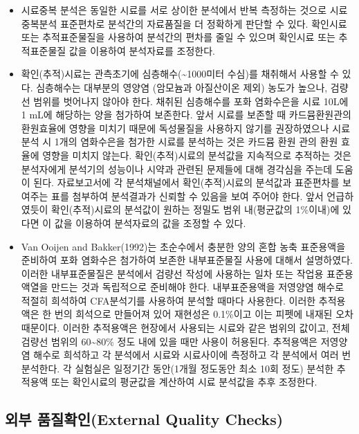 \documentclass[
]{book}
\begin{document}
\begin{itemize}
\item
  시료중복 분석은 동일한 시료를 서로 상이한 분석에서 반복 측정하는 것으로 시료 중복분석 표준편차로 분석간의 자료품질을 더 정확하게 판단할 수 있다. 확인시료 또는 추적표준물질을 사용하여 분석간의 편차를 줄일 수 있으며 확인시료 또는 추적표준물질 값을 이용하여 분석자료를 조정한다.
\item
  확인(추적)시료는 관측초기에 심층해수(\textasciitilde1000미터 수심)를 채취해서 사용할 수 있다. 심층해수는 대부분의 영양염 (암모늄과 아질산이온 제외) 농도가 높으나, 검량선 범위를 벗어나지 않아야 한다. 채취된 심층해수를 포화 염화수은을 시료 10L에 1 mL에 해당하는 양을 첨가하여 보존한다. 앞서 시료를 보존할 때 카드뮴환원관의 환원효율에 영향을 미치기 때문에 독성물질을 사용하지 않기를 권장하였으나 시료분석 시 1개의 염화수은을 첨가한 시료를 분석하는 것은 카드뮴 환원 관의 환원 효율에 영향을 미치지 않는다. 확인(추적)시료의 분석값을 지속적으로 추적하는 것은 분석자에게 분석기의 성능이나 시약과 관련된 문제들에 대해 경각심을 주는데 도움이 된다. 자료보고서에 각 분석채널에서 확인(추적)시료의 분석값과 표준편차를 보여주는 표를 첨부하여 분석결과가 신뢰할 수 있음을 보여 주어야 한다. 앞서 언급하였듯이 확인(추적)시료의 분석값이 원하는 정밀도 범위 내(평균값의 1\%이내)에 있다면 이 값을 이용하여 분석자료의 값을 조정할 수 있다.
\item
  Van Ooijen and Bakker(1992)는 초순수에서 충분한 양의 혼합 농축 표준용액을 준비하여 포화 염화수은 첨가하여 보존한 내부표준물질 사용에 대해서 설명하였다. 이러한 내부표준물질은 분석에서 검량선 작성에 사용하는 일차 또는 작업용 표준용액열을 만드는 것과 독립적으로 준비해야 한다. 내부표준용액을 저영양염 해수로 적절히 희석하여 CFA분석기를 사용하여 분석할 때마다 사용한다. 이러한 추적용액은 한 번의 희석으로 만들어져 있어 재현성은 0.1\%이고 이는 피펫에 내재된 오차 때문이다. 이러한 추적용액은 현장에서 사용되는 시료와 같은 범위의 값이고, 전체 검량선 범위의 60\textasciitilde80\% 정도 내에 있을 때만 사용이 허용된다. 추적용액은 저영양염 해수로 희석하고 각 분석에서 시료와 시료사이에 측정하고 각 분석에서 여러 번 분석한다. 각 실험실은 일정기간 동안(1개월 정도동안 최소 10회 정도) 분석한 추적용액 또는 확인시료의 평균값을 계산하여 시료 분석값을 추후 조정한다.
\end{itemize}

\hypertarget{uxc678uxbd80-uxd488uxc9c8uxd655uxc778external-quality-checks}{%
\subsection{외부 품질확인(External Quality Checks)}\label{uxc678uxbd80-uxd488uxc9c8uxd655uxc778external-quality-checks}}
\end{document}
